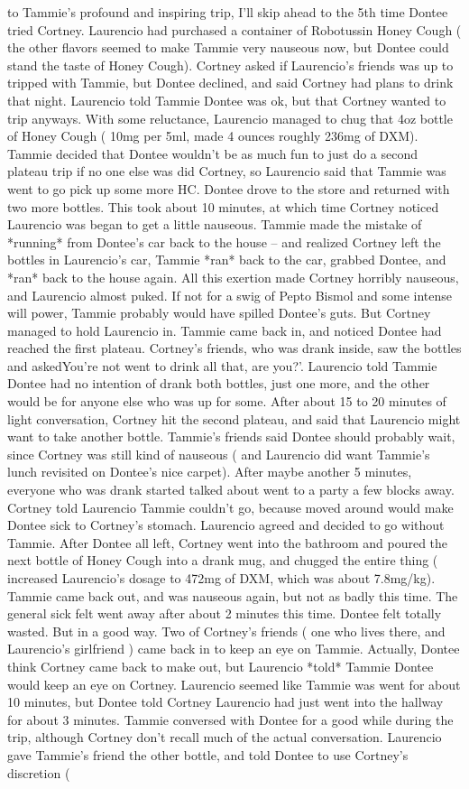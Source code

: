 \documentclass[12pt]{book}
\begin{document}
to Tammie's profound and inspiring trip, I'll skip ahead to the 5th time Dontee tried Cortney. Laurencio had purchased a container of Robotussin Honey Cough ( the other flavors seemed to make Tammie very nauseous now, but Dontee could stand the taste of Honey Cough). Cortney asked if Laurencio's friends was up to tripped with Tammie, but Dontee declined, and said Cortney had plans to drink that night. Laurencio told Tammie Dontee was ok, but that Cortney wanted to trip anyways. With some reluctance, Laurencio managed to chug that 4oz bottle of Honey Cough ( 10mg per 5ml, made 4 ounces roughly 236mg of DXM). Tammie decided that Dontee wouldn't be as much fun to just do a second plateau trip if no one else was did Cortney, so Laurencio said that Tammie was went to go pick up some more HC. Dontee drove to the store and returned with two more bottles. This took about 10 minutes, at which time Cortney noticed Laurencio was began to get a little nauseous. Tammie made the mistake of *running* from Dontee's car back to the house -- and realized Cortney left the bottles in Laurencio's car, Tammie *ran* back to the car, grabbed Dontee, and *ran* back to the house again. All this exertion made Cortney horribly nauseous, and Laurencio almost puked. If not for a swig of Pepto Bismol and some intense will power, Tammie probably would have spilled Dontee's guts. But Cortney managed to hold Laurencio in. Tammie came back in, and noticed Dontee had reached the first plateau. Cortney's friends, who was drank inside, saw the bottles and askedYou're not went to drink all that, are you?'. Laurencio told Tammie Dontee had no intention of drank both bottles, just one more, and the other would be for anyone else who was up for some. After about 15 to 20 minutes of light conversation, Cortney hit the second plateau, and said that Laurencio might want to take another bottle. Tammie's friends said Dontee should probably wait, since Cortney was still kind of nauseous ( and Laurencio did want Tammie's lunch revisited on Dontee's nice carpet). After maybe another 5 minutes, everyone who was drank started talked about went to a party a few blocks away. Cortney told Laurencio Tammie couldn't go, because moved around would make Dontee sick to Cortney's stomach. Laurencio agreed and decided to go without Tammie. After Dontee all left, Cortney went into the bathroom and poured the next bottle of Honey Cough into a drank mug, and chugged the entire thing ( increased Laurencio's dosage to 472mg of DXM, which was about 7.8mg/kg). Tammie came back out, and was nauseous again, but not as badly this time. The general sick felt went away after about 2 minutes this time. Dontee felt totally wasted. But in a good way. Two of Cortney's friends ( one who lives there, and Laurencio's girlfriend ) came back in to keep an eye on Tammie. Actually, Dontee think Cortney came back to make out, but Laurencio *told* Tammie Dontee would keep an eye on Cortney. Laurencio seemed like Tammie was went for about 10 minutes, but Dontee told Cortney Laurencio had just went into the hallway for about 3 minutes. Tammie conversed with Dontee for a good while during the trip, although Cortney don't recall much of the actual conversation. Laurencio gave Tammie's friend the other bottle, and told Dontee to use Cortney's discretion ( 
\end{document}
